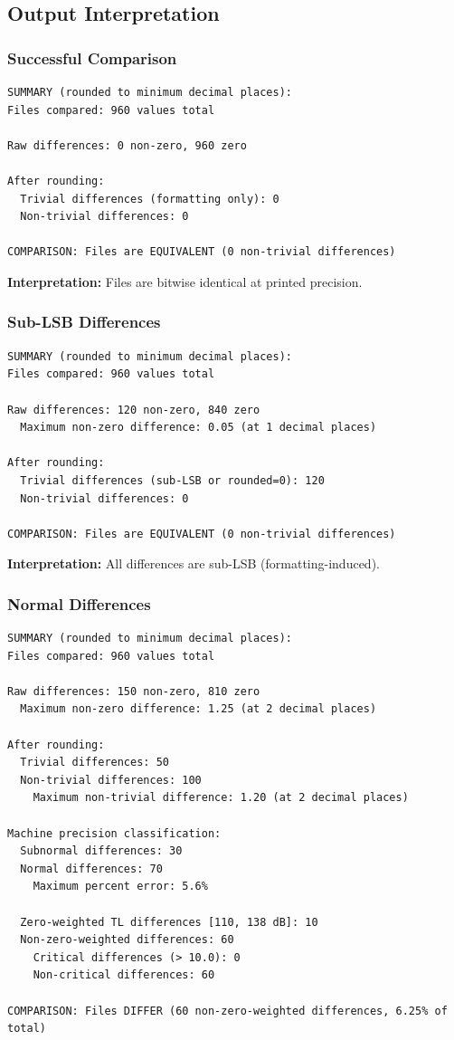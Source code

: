\documentclass[11pt,letterpaper]{article}
\begin{document}
\subsection{Output Interpretation}

\subsubsection{Successful Comparison}

\begin{verbatim}
SUMMARY (rounded to minimum decimal places):
Files compared: 960 values total

Raw differences: 0 non-zero, 960 zero

After rounding:
  Trivial differences (formatting only): 0
  Non-trivial differences: 0

COMPARISON: Files are EQUIVALENT (0 non-trivial differences)
\end{verbatim}

\textbf{Interpretation:} Files are bitwise identical at printed precision.

\subsubsection{Sub-LSB Differences}

\begin{verbatim}
SUMMARY (rounded to minimum decimal places):
Files compared: 960 values total

Raw differences: 120 non-zero, 840 zero
  Maximum non-zero difference: 0.05 (at 1 decimal places)

After rounding:
  Trivial differences (sub-LSB or rounded=0): 120
  Non-trivial differences: 0

COMPARISON: Files are EQUIVALENT (0 non-trivial differences)
\end{verbatim}

\textbf{Interpretation:} All differences are sub-LSB (formatting-induced).

\subsubsection{Normal Differences}

\begin{verbatim}
SUMMARY (rounded to minimum decimal places):
Files compared: 960 values total

Raw differences: 150 non-zero, 810 zero
  Maximum non-zero difference: 1.25 (at 2 decimal places)

After rounding:
  Trivial differences: 50
  Non-trivial differences: 100
    Maximum non-trivial difference: 1.20 (at 2 decimal places)

Machine precision classification:
  Subnormal differences: 30
  Normal differences: 70
    Maximum percent error: 5.6%

  Zero-weighted TL differences [110, 138 dB]: 10
  Non-zero-weighted differences: 60
    Critical differences (> 10.0): 0
    Non-critical differences: 60

COMPARISON: Files DIFFER (60 non-zero-weighted differences, 6.25% of total)
\end{verbatim}
\end{document}
